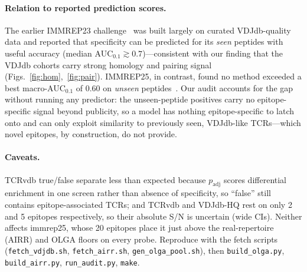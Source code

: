 \paragraph{Relation to reported prediction scores.} The earlier IMMREP23
challenge~\cite{Nielsen_2024} was built largely on curated VDJdb-quality data and
reported that specificity can be predicted for its \emph{seen} peptides with useful
accuracy (median AUC$_{0.1}\gtrsim 0.7$)---consistent with our finding that the VDJdb
cohorts carry strong homology and pairing signal (Figs.~\ref{fig:hom},~\ref{fig:pair}).
IMMREP25, in contrast, found no method exceeded a best macro-AUC$_{0.1}$ of $0.60$ on
\emph{unseen} peptides~\cite{Richardson2026}. Our audit accounts for the gap without
running any predictor: the unseen-peptide positives carry no epitope-specific signal
beyond publicity, so a model has nothing epitope-specific to latch onto and can only
exploit similarity to previously seen, VDJdb-like TCRs---which novel epitopes, by
construction, do not provide.

\paragraph{Caveats.} TCRvdb true/false separate less than expected because
$p_{\text{adj}}$ scores differential enrichment in one screen rather than absence of
specificity, so ``false'' still contains epitope-associated TCRs; and TCRvdb and
VDJdb-HQ rest on only 2 and 5 epitopes respectively, so their absolute S/N is
uncertain (wide CIs). Neither affects immrep25, whose 20 epitopes place it just above
the real-repertoire (AIRR) and OLGA floors on every probe. Reproduce with the fetch
scripts (\texttt{fetch\_vdjdb.sh}, \texttt{fetch\_airr.sh}, \texttt{gen\_olga\_pool.sh}),
then \texttt{build\_olga.py}, \texttt{build\_airr.py}, \texttt{run\_audit.py}, \texttt{make}.
